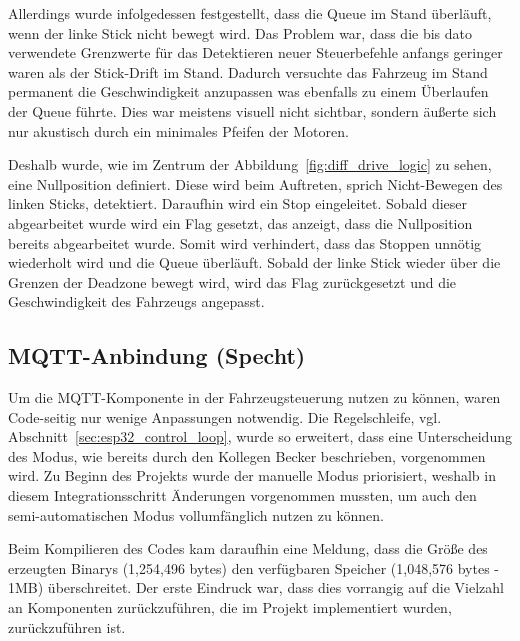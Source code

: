 Allerdings wurde infolgedessen festgestellt, dass die Queue im Stand überläuft, wenn der linke Stick nicht bewegt wird. Das Problem war, dass die bis dato verwendete Grenzwerte für das Detektieren neuer Steuerbefehle anfangs geringer waren als der Stick-Drift im Stand. Dadurch versuchte das Fahrzeug im Stand permanent die Geschwindigkeit anzupassen was ebenfalls zu einem Überlaufen der Queue führte. Dies war meistens visuell nicht sichtbar, sondern äußerte sich nur akustisch durch ein minimales Pfeifen der Motoren. \newline

Deshalb wurde, wie im Zentrum der Abbildung~\ref{fig:diff_drive_logic} zu sehen, eine Nullposition definiert. Diese wird beim Auftreten, sprich Nicht-Bewegen des linken Sticks, detektiert. Daraufhin wird ein Stop eingeleitet. Sobald dieser abgearbeitet wurde wird ein Flag gesetzt, das anzeigt, dass die Nullposition bereits abgearbeitet wurde. Somit wird verhindert, dass das Stoppen unnötig wiederholt wird und die Queue überläuft. Sobald der linke Stick wieder über die Grenzen der Deadzone bewegt wird, wird das Flag zurückgesetzt und die Geschwindigkeit des Fahrzeugs angepasst. \newline

\subsection{MQTT-Anbindung (Specht)}

Um die MQTT-Komponente in der Fahrzeugsteuerung nutzen zu können, waren Code-seitig nur wenige Anpassungen notwendig. Die Regelschleife, vgl. Abschnitt~\ref{sec:esp32_control_loop}, wurde so erweitert, dass eine Unterscheidung des Modus, wie bereits durch den Kollegen Becker beschrieben, vorgenommen wird. Zu Beginn des Projekts wurde der manuelle Modus priorisiert, weshalb in diesem Integrationsschritt Änderungen vorgenommen mussten, um auch den semi-automatischen Modus vollumfänglich nutzen zu können. \newline

Beim Kompilieren des Codes kam daraufhin eine Meldung, dass die Größe des erzeugten Binarys (1,254,496 bytes) den verfügbaren Speicher (1,048,576 bytes - 1MB) überschreitet. Der erste Eindruck war, dass dies vorrangig auf die Vielzahl an Komponenten zurückzuführen, die im Projekt implementiert wurden, zurückzuführen ist.

